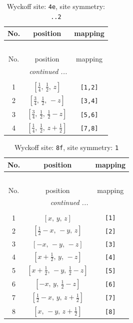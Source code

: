 \documentclass[fleqn,8pt]{jsarticle}
\begin{document}
\renewcommand{\arraystretch}{1.2}
\begin{longtable}{ccc}
\caption{Wyckoff site: {\tt 4e}, site symmetry: {\tt ..2}}
 \\
 \hline \hline
No. & position & mapping \\ \hline \endfirsthead

\multicolumn{2}{l}{\tablename\ \thetable{}} \\
 \hline \hline
No. & position & mapping \\ \hline \endhead

 \hline \hline
\multicolumn{2}{r}{\footnotesize\it continued ...} \\ \endfoot

 \hline \hline
\multicolumn{2}{r}{} \\ \endlastfoot

1 & $\left[ \frac{1}{4},\, \frac{1}{2},\, z \right]$ & {\tt [1,2]} \\ \hline
2 & $\left[ \frac{3}{4},\, \frac{1}{2},\, - z \right]$ & {\tt [3,4]} \\ \hline
3 & $\left[ \frac{3}{4},\, \frac{1}{2},\, \frac{1}{2} - z \right]$ & {\tt [5,6]} \\ \hline
4 & $\left[ \frac{1}{4},\, \frac{1}{2},\, z + \frac{1}{2} \right]$ & {\tt [7,8]} \\
\end{longtable}
\renewcommand{\arraystretch}{1.2}
\begin{longtable}{ccc}
\caption{Wyckoff site: {\tt 8f}, site symmetry: {\tt 1}}
 \\
 \hline \hline
No. & position & mapping \\ \hline \endfirsthead

\multicolumn{2}{l}{\tablename\ \thetable{}} \\
 \hline \hline
No. & position & mapping \\ \hline \endhead

 \hline \hline
\multicolumn{2}{r}{\footnotesize\it continued ...} \\ \endfoot

 \hline \hline
\multicolumn{2}{r}{} \\ \endlastfoot

1 & $\left[ x,\, y,\, z \right]$ & {\tt [1]} \\ \hline
2 & $\left[ \frac{1}{2} - x,\, - y,\, z \right]$ & {\tt [2]} \\ \hline
3 & $\left[ - x,\, - y,\, - z \right]$ & {\tt [3]} \\ \hline
4 & $\left[ x + \frac{1}{2},\, y,\, - z \right]$ & {\tt [4]} \\ \hline
5 & $\left[ x + \frac{1}{2},\, - y,\, \frac{1}{2} - z \right]$ & {\tt [5]} \\ \hline
6 & $\left[ - x,\, y,\, \frac{1}{2} - z \right]$ & {\tt [6]} \\ \hline
7 & $\left[ \frac{1}{2} - x,\, y,\, z + \frac{1}{2} \right]$ & {\tt [7]} \\ \hline
8 & $\left[ x,\, - y,\, z + \frac{1}{2} \right]$ & {\tt [8]} \\
\end{longtable}
\end{document}

